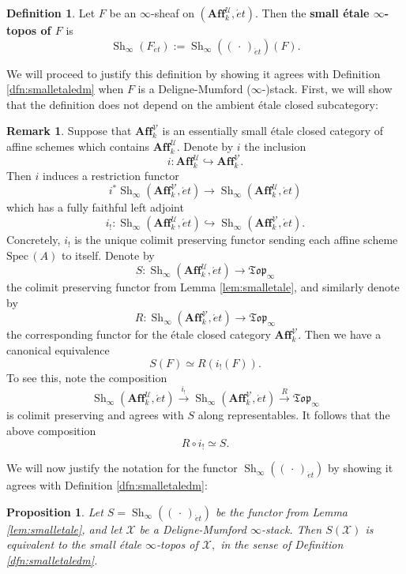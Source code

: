 \documentclass[12pt]{amsart}
\newtheorem{proposition}[dummy]{Proposition}
\theoremstyle{definition}
\newtheorem{definition}[dummy]{Definition}
\newtheorem{remark}[dummy]{Remark}
\newcommand{\cU}{\mathcal{U}}
\newcommand{\cV}{\mathcal{V}}
\newcommand{\cX}{\mathcal{X}}
\newcommand{\Affku}{\mathbf{Aff}^{\cU}_{k}}
\newcommand{\Topi}{\mathfrak{Top}_\i}
\newcommand{\Spec}{\mathrm{Spec}\,}
\newcommand{\Sh}{\operatorname{Sh}}
\newcommand{\et}{\acute{e}t}
\renewcommand{\i}{\infty}
\def\Shi{\Sh_\i}
\def\blank{\mspace{3mu}\cdot\mspace{3mu}}
\begin{document}
\begin{definition}
Let $F$ be an $\i$-sheaf on $\left(\Affku,\et\right).$ Then the \textbf{small \'etale $\i$-topos of $F$} is $$\Shi\left(F_{\et}\right):=\Shi\left(\left(\blank\right)_{\et}\right)\left(F\right).$$
\end{definition}

We will proceed to justify this definition by showing it agrees with Definition \ref{dfn:smalletaledm} when $F$ is a Deligne-Mumford ($\i$-)stack. First, we will show that the definition does not depend on the ambient \'etale closed subcategory:

\begin{remark}
Suppose that $\mathbf{Aff}^{\cV}_k$ is an essentially small \'etale closed category of affine schemes which contains $\Affku$. Denote by $i$ the inclusion $$i:\Affku \hookrightarrow \mathbf{Aff}^{\cV}_k.$$ Then $i$ induces a restriction functor $$i^*\Shi\left(\mathbf{Aff}^{\cV}_k,\et\right) \to \Shi\left(\Affku,\et\right)$$ which has a fully faithful left adjoint $$i_!:\Shi\left(\Affku,\et\right) \hookrightarrow \Shi\left(\mathbf{Aff}^{\cV}_k,\et\right).$$ Concretely, $i_!$ is the unique colimit preserving functor sending each affine scheme $\Spec\left(A\right)$ to itself. Denote by $$S:\Shi\left(\Affku,\et\right) \to \Topi$$ the colimit preserving functor from Lemma \ref{lem:smalletale}, and similarly denote by $$R:\Shi\left(\mathbf{Aff}^{\cV}_k,\et\right) \to \Topi$$ the corresponding functor for the \'etale closed category $\mathbf{Aff}^{\cV}_k.$ Then we have a canonical equivalence $$S\left(F\right)\simeq R\left(i_!\left(F\right)\right).$$ To see this, note the composition $$\Shi\left(\Affku,\et\right) \stackrel{i_!}{\longrightarrow} \Shi\left(\mathbf{Aff}^{\cV}_k,\et\right) \stackrel{R}{\longrightarrow} \Topi$$ is colimit preserving and agrees with $S$ along representables. It follows that the above composition $$R \circ i_! \simeq S.$$
\end{remark}

We will now justify the notation for the functor $\Shi\left(\left(\blank\right)_{\et}\right)$ by showing it agrees with Definition \ref{dfn:smalletaledm}:

\begin{proposition}
Let $S=\Shi\left(\left(\blank\right)_{\et}\right)$ be the functor from Lemma \ref{lem:smalletale}, and let $\cX$ be a Deligne-Mumford $\i$-stack. Then $S\left(\cX\right)$ is equivalent to the small \'etale $\i$-topos of $\cX,$ in the sense of Definition \ref{dfn:smalletaledm}.
\end{proposition}
\end{document}
